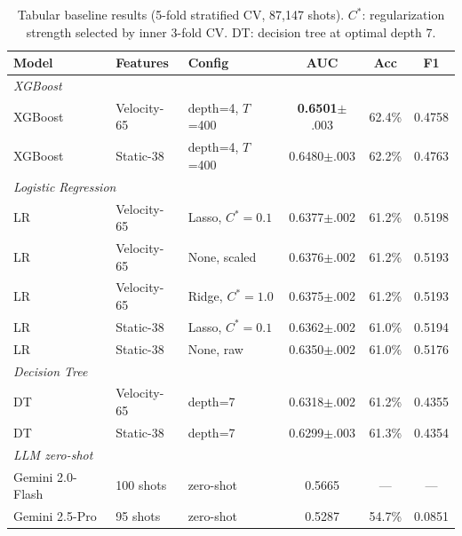 \documentclass{article}
\begin{document}
\begin{table}[H]
\centering
\caption{Tabular baseline results (5-fold stratified CV, 87,147 shots). $C^*$: regularization strength selected by inner 3-fold CV. DT: decision tree at optimal depth 7.}
\label{tab:baselines}
\small
\begin{tabular}{@{}lllccc@{}}
\toprule
\textbf{Model} & \textbf{Features} & \textbf{Config} & \textbf{AUC} & \textbf{Acc} & \textbf{F1} \\
\midrule
\multicolumn{6}{l}{\emph{XGBoost}} \\
XGBoost & Velocity-65 & depth=4, $T$=400 & \textbf{0.6501}{\tiny$\pm$.003} & 62.4\% & 0.4758 \\
XGBoost & Static-38 & depth=4, $T$=400 & 0.6480{\tiny$\pm$.003} & 62.2\% & 0.4763 \\
\midrule
\multicolumn{6}{l}{\emph{Logistic Regression}} \\
LR & Velocity-65 & Lasso, $C^*\!=\!0.1$ & 0.6377{\tiny$\pm$.002} & 61.2\% & 0.5198 \\
LR & Velocity-65 & None, scaled & 0.6376{\tiny$\pm$.002} & 61.2\% & 0.5193 \\
LR & Velocity-65 & Ridge, $C^*\!=\!1.0$ & 0.6375{\tiny$\pm$.002} & 61.2\% & 0.5193 \\
LR & Static-38 & Lasso, $C^*\!=\!0.1$ & 0.6362{\tiny$\pm$.002} & 61.0\% & 0.5194 \\
LR & Static-38 & None, raw & 0.6350{\tiny$\pm$.002} & 61.0\% & 0.5176 \\
\midrule
\multicolumn{6}{l}{\emph{Decision Tree}} \\
DT & Velocity-65 & depth=7 & 0.6318{\tiny$\pm$.002} & 61.2\% & 0.4355 \\
DT & Static-38 & depth=7 & 0.6299{\tiny$\pm$.003} & 61.3\% & 0.4354 \\
\midrule
\multicolumn{6}{l}{\emph{LLM zero-shot}} \\
Gemini 2.0-Flash & 100 shots & zero-shot & 0.5665 & --- & --- \\
Gemini 2.5-Pro & 95 shots & zero-shot & 0.5287 & 54.7\% & 0.0851 \\
\bottomrule
\end{tabular}
\end{table}
\end{document}
